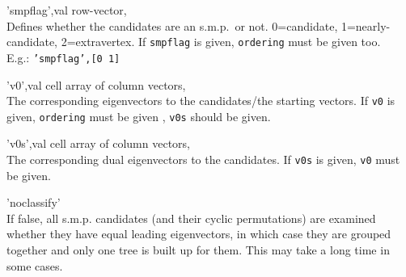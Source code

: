 \begin{param}
\item['smpflag',val] row-vector, \\Defines whether the candidates are an s.m.p.\ or not. 0=candidate, 1=nearly-candidate, 2=extravertex. If \texttt{smpflag} is given, \texttt{ordering} must be given too.\\
E.g.: \texttt{'smpflag',[0 1]}

\item['v0',val] cell array of column vectors, \\The corresponding eigenvectors to the candidates/the starting vectors. If \texttt{v0} is given, \texttt{ordering} must be given , \texttt{v0s} should be given.

\item['v0s',val] cell array of column vectors, \\The corresponding dual eigenvectors to the candidates. If \texttt{v0s} is given, \texttt{v0} must be given.

\item['noclassify'] \\If false, all s.m.p. candidates (and their cyclic permutations) are examined whether they have equal leading eigenvectors, in which case they are grouped together and only one tree is built up for them. This may take a long time in some cases.



\end{param}

